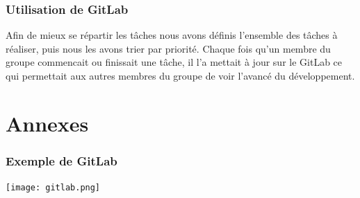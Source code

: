 \documentclass[12pt]{article}
\begin{document}
\subsubsection{Utilisation de GitLab}
Afin de mieux se répartir les tâches nous avons définis l'ensemble des tâches à réaliser, puis nous les avons trier par priorité. Chaque fois qu'un membre du groupe commencait ou finissait une tâche, il l'a mettait à jour sur le GitLab ce qui permettait aux autres membres du groupe de voir l'avancé du développement.
\newpage
\section{Annexes}
\subsubsection{Exemple de GitLab}
\texttt{[image: gitlab.png]}
\end{document}
